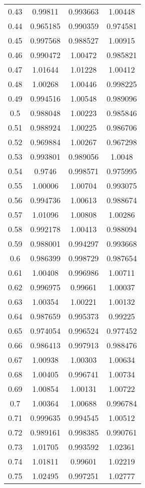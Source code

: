 \begin{table}[h!]
\begin{tabular}{|c|c|c|c|}
0.43 & 0.99811 & 0.993663 & 1.00448 \\
0.44 & 0.965185 & 0.990359 & 0.974581 \\
0.45 & 0.997568 & 0.988527 & 1.00915 \\
0.46 & 0.990472 & 1.00472 & 0.985821 \\
0.47 & 1.01644 & 1.01228 & 1.00412 \\
0.48 & 1.00268 & 1.00446 & 0.998225 \\
0.49 & 0.994516 & 1.00548 & 0.989096 \\
0.5 & 0.988048 & 1.00223 & 0.985846 \\
0.51 & 0.988924 & 1.00225 & 0.986706 \\
0.52 & 0.969884 & 1.00267 & 0.967298 \\
0.53 & 0.993801 & 0.989056 & 1.0048 \\
0.54 & 0.9746 & 0.998571 & 0.975995 \\
0.55 & 1.00006 & 1.00704 & 0.993075 \\
0.56 & 0.994736 & 1.00613 & 0.988674 \\
0.57 & 1.01096 & 1.00808 & 1.00286 \\
0.58 & 0.992178 & 1.00413 & 0.988094 \\
0.59 & 0.988001 & 0.994297 & 0.993668 \\
0.6 & 0.986399 & 0.998729 & 0.987654 \\
0.61 & 1.00408 & 0.996986 & 1.00711 \\
0.62 & 0.996975 & 0.99661 & 1.00037 \\
0.63 & 1.00354 & 1.00221 & 1.00132 \\
0.64 & 0.987659 & 0.995373 & 0.99225 \\
0.65 & 0.974054 & 0.996524 & 0.977452 \\
0.66 & 0.986413 & 0.997913 & 0.988476 \\
0.67 & 1.00938 & 1.00303 & 1.00634 \\
0.68 & 1.00405 & 0.996741 & 1.00734 \\
0.69 & 1.00854 & 1.00131 & 1.00722 \\
0.7 & 1.00364 & 1.00688 & 0.996784 \\
0.71 & 0.999635 & 0.994545 & 1.00512 \\
0.72 & 0.989161 & 0.998385 & 0.990761 \\
0.73 & 1.01705 & 0.993592 & 1.02361 \\
0.74 & 1.01811 & 0.99601 & 1.02219 \\
0.75 & 1.02495 & 0.997251 & 1.02777 \\

\end{tabular}
\end{table}
